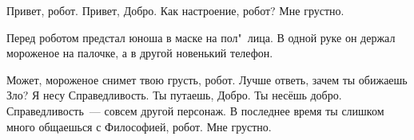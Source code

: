 \begin{dialog}
\X Привет, робот.
\R Привет, Добро.
\X Как настроение, робот?
\R Мне грустно.
\end{dialog}

\begin{monolog}
Перед роботом предстал юноша в маске на пол"~лица. В одной руке он держал мороженое на палочке, а в другой новенький телефон.
\end{monolog}

\begin{dialog}
\X Может, мороженое снимет твою грусть, робот.
\R Лучше ответь, зачем ты обижаешь Зло?
\X Я несу Справедливость.
\R Ты путаешь, Добро. Ты несёшь добро. Справедливость~--- совсем другой персонаж.
\X В последнее время ты слишком много общаешься с Философией, робот. 
\R Мне грустно.
\end{dialog}